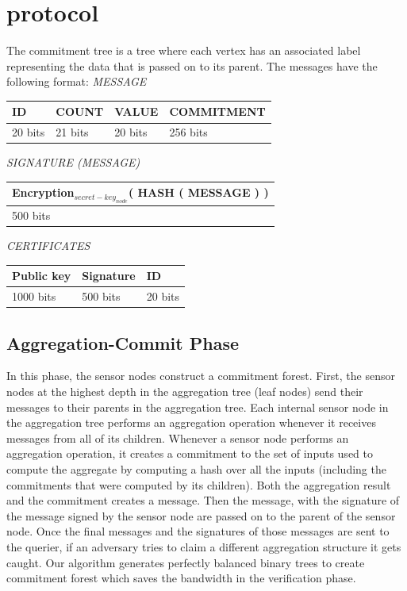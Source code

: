 \chapter{protocol}
	
	The commitment tree is a tree where each vertex has an associated label representing the data that is passed on to its parent. The messages have the following format: 
	\textit{MESSAGE}
	\newline
	
	\begin{tabular}{ | l | l | l | l |}
		\hline
		ID & COUNT & VALUE & COMMITMENT \\
		\hline
		20 bits & 21 bits & 20 bits & 256 bits\\
		\hline
	\end{tabular}
	\newline
	\newline
	\textit{SIGNATURE (MESSAGE)}
	\newline

	\begin{tabular}{ |l| }
		\hline
		Encryption$_{secret-key_{node}}$( HASH ( MESSAGE ) )\\
		\hline
		500 bits\\
		\hline
	\end{tabular}
	\newline
	\newline
	\textit{CERTIFICATES}
	\newline

	\begin{tabular}{ | l | l | l | }
		\hline
			Public key  & Signature & ID \\
		\hline
			1000 bits & 500 bits & 20 bits \\
		\hline

	\end{tabular}

	\newpage

\section{Aggregation-Commit Phase}
	In this phase, the sensor nodes construct a commitment forest. 
	First, the sensor nodes at the highest depth in the aggregation tree (leaf nodes) send their messages to their parents in the aggregation tree.
	Each internal sensor node in the aggregation tree performs an aggregation operation whenever it receives messages from all of its children.
	Whenever a sensor node performs an aggregation operation, it creates a commitment to the set of inputs used to compute the aggregate by computing a hash over all the inputs (including the commitments that were computed by its children). 
	Both the aggregation result and the commitment creates a message.
	Then the message, with the signature of the message signed by the sensor node are passed on to the parent of the sensor node.
	Once the final messages and the signatures of those messages are sent to the querier, if an adversary tries to claim a different aggregation structure it gets caught.
	Our algorithm generates perfectly balanced binary trees to create commitment forest which saves the bandwidth in the verification phase.


